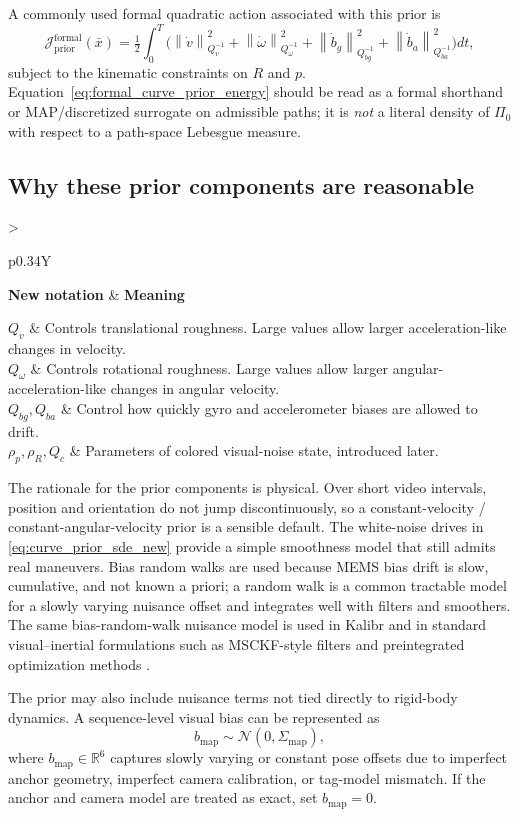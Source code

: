 \documentclass[11pt]{report}
\newcommand{\R}{\mathbb{R}}
\newcommand{\norm}[1]{\left\lVert #1 \right\rVert}
\newcommand{\Half}{\tfrac12}
\newcommand{\NotationTable}[1]{%
\vspace{0.6mm}
{\scriptsize
\setlength{\tabcolsep}{2.5pt}
\begin{tabularx}{\columnwidth}{>{\raggedright\arraybackslash}p{0.34\columnwidth}Y}
\toprule
\textbf{New notation} & \textbf{Meaning}\\
\midrule
#1\\
\bottomrule
\end{tabularx}}
\vspace{0.8mm}}
\begin{document}
A commonly used formal quadratic action associated with this prior is
\begin{equation}
\mathcal J_{\mathrm{prior}}^{\mathrm{formal}}(\bar x)
=\Half\int_0^T \Big(\norm{\dot v}_{Q_v^{-1}}^2+\norm{\dot\omega}_{Q_\omega^{-1}}^2+\norm{\dot b_g}_{Q_{bg}^{-1}}^2+\norm{\dot b_a}_{Q_{ba}^{-1}}^2\Big)dt,
\label{eq:formal_curve_prior_energy}
\end{equation}
subject to the kinematic constraints on $R$ and $p$. Equation~\eqref{eq:formal_curve_prior_energy} should be read as a formal shorthand or MAP/discretized surrogate on admissible paths; it is \emph{not} a literal density of $\Pi_0$ with respect to a path-space Lebesgue measure.

\subsection{Why these prior components are reasonable}
\NotationTable{
$Q_v$ & Controls translational roughness. Large values allow larger acceleration-like changes in velocity.\\
$Q_\omega$ & Controls rotational roughness. Large values allow larger angular-acceleration-like changes in angular velocity.\\
$Q_{bg},Q_{ba}$ & Control how quickly gyro and accelerometer biases are allowed to drift.\\
$\rho_p,\rho_R,Q_c$ & Parameters of colored visual-noise state, introduced later.}

The rationale for the prior components is physical. Over short video intervals, position and orientation do not jump discontinuously, so a constant-velocity / constant-angular-velocity prior is a sensible default. The white-noise drives in \eqref{eq:curve_prior_sde_new} provide a simple smoothness model that still admits real maneuvers. Bias random walks are used because MEMS bias drift is slow, cumulative, and not known a priori; a random walk is a common tractable model for a slowly varying nuisance offset and integrates well with filters and smoothers. The same bias-random-walk nuisance model is used in Kalibr and in standard visual--inertial formulations such as MSCKF-style filters and preintegrated optimization methods \citep{kalibr_noise,mourikis2007msckf,forster2017preintegration}.

The prior may also include nuisance terms not tied directly to rigid-body dynamics. A sequence-level visual bias can be represented as
\begin{equation}
 b_{\mathrm{map}}\sim \mathcal N(0,\Sigma_{\mathrm{map}}),
\end{equation}
where $b_{\mathrm{map}}\in\R^6$ captures slowly varying or constant pose offsets due to imperfect anchor geometry, imperfect camera calibration, or tag-model mismatch. If the anchor and camera model are treated as exact, set $b_{\mathrm{map}}=0$.
\end{document}
